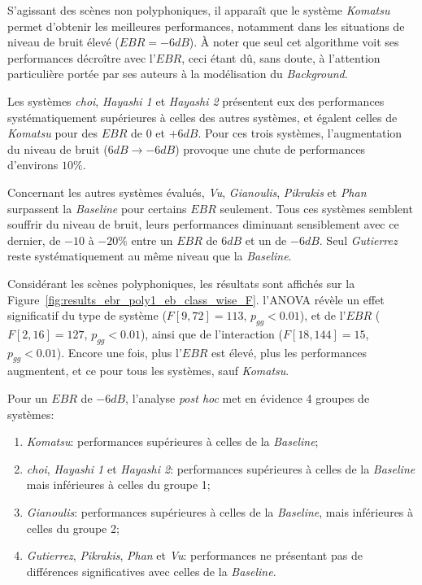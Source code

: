 S'agissant des scènes non polyphoniques, il apparaît que le système \emph{Komatsu} permet d'obtenir les meilleures performances, notamment dans les situations de niveau de bruit élevé ($EBR=-6dB$). À noter que seul cet algorithme voit ses performances décroître avec l'$EBR$, ceci étant dû, sans doute, à l'attention particulière portée par ses auteurs à la modélisation du \emph{Background}.


Les systèmes \emph{choi}, \emph{Hayashi 1} et \emph{Hayashi 2} présentent eux des performances systématiquement supérieures à celles des autres systèmes, et égalent celles de \emph{Komatsu} pour des $EBR$ de $0$ et $+6dB$. Pour ces trois systèmes, l'augmentation du niveau de bruit ($6dB\rightarrow -6dB$) provoque une chute de performances d'environs $10\%$.

Concernant les autres systèmes évalués, \emph{Vu}, \emph{Gianoulis}, \emph{Pikrakis} et \emph{Phan} surpassent la \emph{Baseline} pour certains $EBR$ seulement. Tous ces systèmes semblent souffrir du niveau de bruit, leurs performances diminuant sensiblement avec ce dernier, de $-10$ à $-20\%$ entre un $EBR$ de $6dB$ et un de $-6dB$. Seul \emph{Gutierrez} reste systématiquement au même niveau que la \emph{Baseline}.

Considérant les scènes polyphoniques, les résultats sont affichés sur la Figure~\ref{fig:results_ebr_poly1_eb_class_wise_F}. l'ANOVA révèle un effet significatif du type de système ($F[9,72]=113$, $p_{gg}<0.01$), et de l'$EBR$ ($F[2,16]=127$, $p_{gg}<0.01$), ainsi que de l'interaction ($F[18,144]=15$, $p_{gg}<0.01$). Encore une fois, plus l'$EBR$ est élevé, plus les performances augmentent, et ce pour tous les systèmes, sauf \emph{Komatsu}.

Pour un $EBR$ de $-6dB$, l'analyse \emph{post hoc} met en évidence 4 groupes de systèmes:

\begin{enumerate}
\item \emph{Komatsu}: performances supérieures à celles de la \emph{Baseline};
\item \emph{choi}, \emph{Hayashi 1} et \emph{Hayashi 2}: performances supérieures à celles de la \emph{Baseline} mais inférieures à celles du groupe 1;
\item \emph{Gianoulis}: performances supérieures à celles de la \emph{Baseline}, mais inférieures à celles du groupe 2;
\item \emph{Gutierrez}, \emph{Pikrakis}, \emph{Phan} et \emph{Vu}: performances ne présentant pas de différences significatives avec celles de la \emph{Baseline}.
\end{enumerate}

